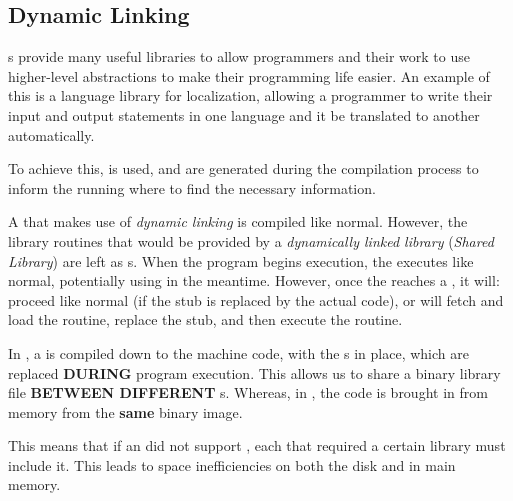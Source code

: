 \subsection{Dynamic Linking}\label{subsec:Dynamic_Linking}
s provide many useful libraries to allow programmers and their work to use higher-level abstractions to make their programming life easier.
An example of this is a language library for localization, allowing a programmer to write their input and output statements in one language and it be translated to another automatically.

To achieve this,  is used, and  are generated during the compilation process to inform the running  where to find the necessary information.

\begin{definition}\label{def:Dynamic_Linking}
  A  that makes use of \emph{dynamic linking} is compiled like normal.
  However, the library routines that would be provided by a \emph{dynamically linked library} (\emph{Shared Library}) are left as s.
  When the program begins execution, the  executes like normal, potentially using  in the meantime.
  However, once the  reaches a , it will: proceed like normal (if the stub is replaced by the actual code), or will fetch and load the routine, replace the stub, and then execute the routine.

  \begin{remark}\label{rmk:Dynamic_Linking_vs_Dynamic_Loading}
    In , a  is compiled down to the machine code, with the s in place, which are replaced \textbf{DURING} program execution.
    This allows us to share a binary library file \textbf{BETWEEN DIFFERENT} s.
    Whereas, in , the code is brought in from memory from the \textbf{same}  binary image.

    This means that if an  did not support , each  that required a certain library must include it.
    This leads to space inefficiencies on both the disk and in main memory.
  \end{remark}
\end{definition}


